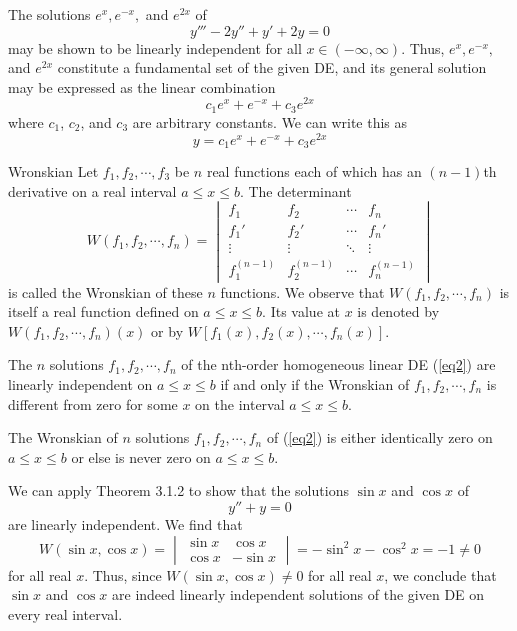 \begin{example}{}{}
    The solutions $e^x, e^{-x},$ and $e^{2x}$ of \[
        y''' - 2y'' + y' + 2y = 0
    \] may be shown to be linearly independent for all $x \in (-\infty, \infty)$. Thus, $e^x, e^{-x},$ and $e^{2x}$ constitute a fundamental set of the given DE, and its general solution may be expressed as the linear combination \[
        c_1e^x + e^{-x} + c_3e^{2x}
    \] where $c_1$, $c_2$, and $c_3$ are arbitrary constants. We can write this as \[
        y = c_1e^x + e^{-x} + c_3e^{2x}
    \]
\end{example}

\begin{definition}{Wronskian}{}
    Let $f_1, f_2, \cdots, f_3$ be $n$ real functions each of which has an $(n-1)$th derivative on a real interval $a \le x \le b$. The determinant \[
        W(f_1, f_2, \cdots, f_n) = 
        \begin{vmatrix} 
            f_1 & f_2 & \cdots & f_n \\
            f_1' & f_2' & \cdots & f_n' \\
            \vdots & \vdots & \ddots & \vdots \\
            f_1^{(n-1)} & f_2^{(n-1)} & \cdots & f_n^{(n-1)}
        \end{vmatrix}
    \] is called the Wronskian of these $n$ functions. We observe that $W(f_1, f_2, \cdots, f_n)$ is itself a real function defined on $a \le x \le b$. Its value at $x$ is denoted by  $W(f_1, f_2, \cdots, f_n)(x)$ or by $W[ f_1(x), f_2(x), \cdots, f_n(x) ]$.
\end{definition}

\begin{theorem}{}{}
    The $n$ solutions $f_1, f_2, \cdots, f_n$ of the nth-order homogeneous linear DE (\ref{eq2}) are linearly independent on $a \le x \le b$ if and only if the Wronskian of $f_1, f_2, \cdots, f_n$ is different from zero for some $x$ on the interval $a \le x \le b$.
\end{theorem}

\begin{theorem}{}{}
    The Wronskian of $n$ solutions $f_1, f_2, \cdots, f_n$ of (\ref{eq2}) is either identically zero on $a \le x \le b$ or else is never zero on $a \le x \le b$.
\end{theorem}

\begin{example}{}{}
    We can apply Theorem 3.1.2 to show that the solutions $\sin x$ and $\cos x$ of \[
        y'' + y = 0
    \] are linearly independent. We find that \[
        W(\sin x, \cos x) = 
        \begin{vmatrix}
            \sin x & \cos x \\
            \cos x & -\sin x
        \end{vmatrix} 
        = -\sin^2x - \cos^2x = -1 \neq 0
    \] for all real $x$. Thus, since $W(\sin x, \cos x) \neq 0$ for all real $x$, we conclude that $\sin x$ and $\cos x$ are indeed linearly independent solutions of the given DE on every real interval.
\end{example}


